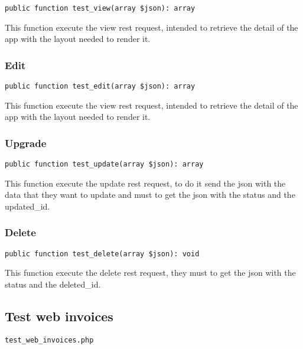 \documentclass[a4paper]{article}
\begin{document}
\begin{lstlisting}
public function test_view(array $json): array
\end{lstlisting}

This function execute the view rest request, intended to retrieve the detail
of the app with the layout needed to render it.

\hypertarget{toc401}{}
\subsubsection{Edit}

\begin{lstlisting}
public function test_edit(array $json): array
\end{lstlisting}

This function execute the view rest request, intended to retrieve the detail
of the app with the layout needed to render it.

\hypertarget{toc402}{}
\subsubsection{Upgrade}

\begin{lstlisting}
public function test_update(array $json): array
\end{lstlisting}

This function execute the update rest request, to do it send the json with
the data that they want to update and must to get the json with the status
and the updated\_id.

\hypertarget{toc403}{}
\subsubsection{Delete}

\begin{lstlisting}
public function test_delete(array $json): void
\end{lstlisting}

This function execute the delete rest request, they must to get the json
with the status and the deleted\_id.

\hypertarget{toc404}{}
\subsection{Test web invoices}

\begin{lstlisting}
test_web_invoices.php
\end{lstlisting}
\end{document}
